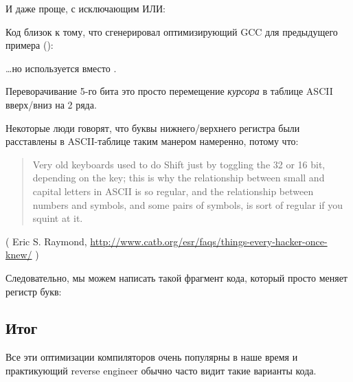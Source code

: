 И даже проще, с исключающим ИЛИ:



Код близок к тому, что сгенерировал оптимизирующий GCC для предыдущего примера ():



\dots но используется  вместо .

Переворачивание 5-го бита это просто перемещение \textit{курсора} в таблице \ac{ASCII} вверх/вниз на 2 ряда.

Некоторые люди говорят, что буквы нижнего/верхнего регистра были расставлены в \ac{ASCII}-таблице таким манером намеренно,
потому что:

\begin{framed}
\begin{quotation}
Very old keyboards used to do Shift just by toggling the 32 or 16 bit, depending on the key; this is why the relationship between small and capital letters in ASCII is so regular, and the relationship between numbers and symbols, and some pairs of symbols, is sort of regular if you squint at it.
\end{quotation}
\end{framed}

( Eric S. Raymond, \url{http://www.catb.org/esr/faqs/things-every-hacker-once-knew/} )

Следовательно, мы можем написать такой фрагмент кода, который просто меняет регистр букв:



\subsection{Итог}

Все эти оптимизации компиляторов очень популярны в наше время и практикующий
reverse engineer обычно часто видит такие варианты кода.
